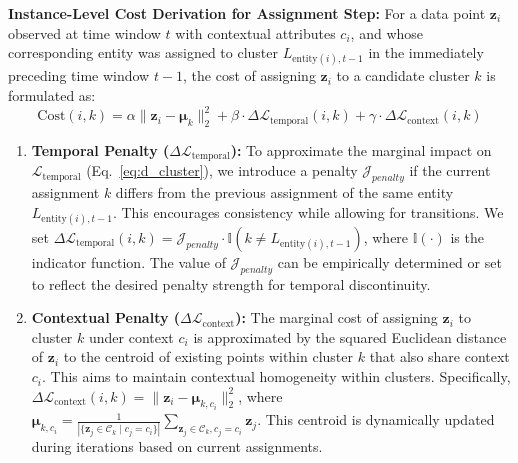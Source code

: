 \documentclass[final,authoryear,3p,times,review,sort&compress]{elsarticle}
\newcommand{\vect}[1]{\mathbf{#1}}
\newcommand{\set}[1]{\mathcal{#1}}
\begin{document}
\textbf{Instance-Level Cost Derivation for Assignment Step:}
For a data point $\vect{z}_i$ observed at time window $t$ with contextual attributes $c_i$, and whose corresponding entity was assigned to cluster $L_{\text{entity}(i), t-1}$ in the immediately preceding time window $t-1$, the cost of assigning $\vect{z}_i$ to a candidate cluster $k$ is formulated as:
\begin{equation}
\label{eq:instance_cost}
\text{Cost}(i, k) = \alpha \|\vect{z}_i - \boldsymbol{\mu}_k\|_2^2 + \beta \cdot \Delta\mathcal{L}_{\text{temporal}}(i, k) + \gamma \cdot \Delta\mathcal{L}_{\text{context}}(i, k)
\end{equation}
\begin{enumerate}[label=(\alph*)]
    \item \textbf{Temporal Penalty ($\Delta\mathcal{L}_{\text{temporal}}$):} To approximate the marginal impact on $\mathcal{L}_{\text{temporal}}$ (Eq.~\ref{eq:d_cluster}), we introduce a penalty $\mathcal{J}_{penalty}$ if the current assignment $k$ differs from the previous assignment of the same entity $L_{\text{entity}(i), t-1}$. This encourages consistency while allowing for transitions. We set $\Delta\mathcal{L}_{\text{temporal}}(i, k) = \mathcal{J}_{penalty} \cdot \mathbb{I}(k \neq L_{\text{entity}(i), t-1})$, where $\mathbb{I}(\cdot)$ is the indicator function. The value of $\mathcal{J}_{penalty}$ can be empirically determined or set to reflect the desired penalty strength for temporal discontinuity.
    \item \textbf{Contextual Penalty ($\Delta\mathcal{L}_{\text{context}}$):} The marginal cost of assigning $\vect{z}_i$ to cluster $k$ under context $c_i$ is approximated by the squared Euclidean distance of $\vect{z}_i$ to the centroid of existing points within cluster $k$ that also share context $c_i$. This aims to maintain contextual homogeneity within clusters. Specifically, $\Delta\mathcal{L}_{\text{context}}(i, k) = \|\vect{z}_i - \boldsymbol{\mu}_{k, c_i}\|_2^2$, where $\boldsymbol{\mu}_{k, c_i} = \frac{1}{|\{\vect{z}_j \in \set{C}_k \mid c_j=c_i\}|} \sum_{\vect{z}_j \in \set{C}_k, c_j=c_i} \vect{z}_j$. This centroid is dynamically updated during iterations based on current assignments.
\end{enumerate}
\end{document}
